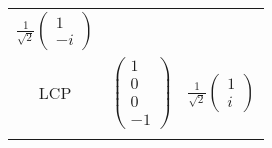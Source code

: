 \documentclass{article}
\begin{document}
\begin{tabular}{c c c}
        $\frac{1}{\sqrt{2}}\begin{pmatrix} 1 \\ -i \end{pmatrix}$  \\
        \addlinespace[1.5ex]
        LCP & 
        $\begin{pmatrix} 1 \\ 0 \\ 0 \\ -1 \end{pmatrix}$ & 
        $\frac{1}{\sqrt{2}}\begin{pmatrix} 1 \\ i \end{pmatrix}$  \\
        \addlinespace[2ex]
        \bottomrule
    \end{tabular}
\end{document}
